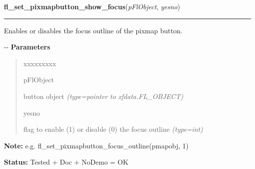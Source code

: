 \hspace{.8\funcindent}\begin{boxedminipage}{\funcwidth}

    \raggedright \textbf{fl\_set\_pixmapbutton\_show\_focus}(\textit{pFlObject}, \textit{yesno})

    \vspace{-1.5ex}

    \rule{\textwidth}{0.5\fboxrule}
\setlength{\parskip}{2ex}

Enables or disables the focus outline of the pixmap button.

-{}-
\setlength{\parskip}{1ex}
      \textbf{Parameters}
      \vspace{-1ex}

      \begin{quote}
        \begin{Ventry}{xxxxxxxxx}

          \item[pFlObject]


button object
            {\it (type=pointer to xfdata.FL\_OBJECT)}

          \item[yesno]


flag to enable (1) or disable (0) the focus outline
            {\it (type=int)}

        \end{Ventry}

      \end{quote}

\textbf{Note:} 
e.g. fl\_set\_pixmapbutton\_focus\_outline(pmapobj, 1)


\textbf{Status:} 
Tested + Doc + NoDemo = OK


    \end{boxedminipage}

    \label{xformslib:flbutton:fl_set_pixmapbutton_focus_data}

    \vspace{0.5ex}


